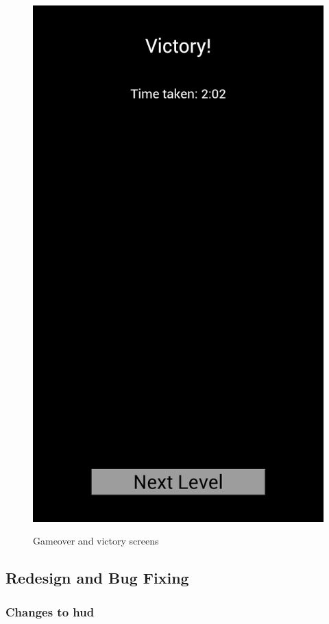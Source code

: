 \begin{figure}[H]
{		\includegraphics[scale=0.18]{pictures/sprint4-screen/victory}
	}
	\caption{Gameover and victory screens}
\end{figure}


\subsection{Redesign and Bug Fixing}
	
	\subsubsection*{Changes to hud}


